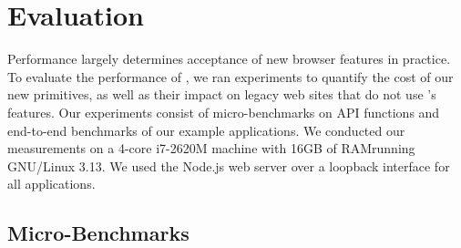 \section{Evaluation}
\label{sec:eval}

Performance largely determines acceptance of new browser features
in practice.
%
To evaluate the performance of \sys{}, we ran experiments to quantify
the cost of our new primitives, as well as their impact on legacy web
sites that do not use \sys{}'s features.
%
Our experiments consist of micro-benchmarks on API functions and
end-to-end benchmarks of our example applications.
%
We conducted our measurements on a 4-core i7-2620M machine with 16GB
of RAM\@ running GNU/Linux 3.13. We used the Node.js web server
over a loopback interface for all applications.

\subsection{Micro-Benchmarks}
\label{sec:eval:micro}

\newcommand*\rot{\rotatebox{90}}

